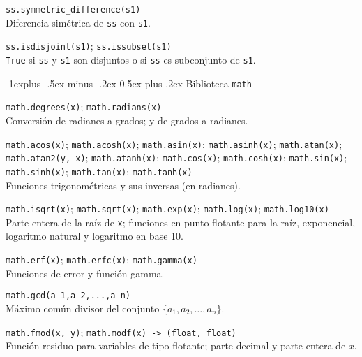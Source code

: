 \documentclass[10pt,landscape]{article}
\makeatletter
\renewcommand{\subsection}{\@startsection{subsection}{2}{0mm}%
                                {-1explus -.5ex minus -.2ex}%
                                {0.5ex plus .2ex}%
                                {\normalfont\normalsize\bfseries}}
\makeatother
\begin{document}
\begin{multicols}{3}
\begin{asparaitem}
\item  \verb|ss.symmetric_difference(s1)| \\
 \quad Diferencia simétrica de \verb|ss| con \verb|s1|.

\item  \verb|ss.isdisjoint(s1)|; \verb|ss.issubset(s1)| \\
  \quad \verb|True| si \verb|ss| y \verb|s1| son disjuntos o si \verb|ss| es subconjunto de \verb|s1|.
\end{asparaitem}

\subsection{Biblioteca \texttt{math}}

\begin{asparaitem}
    \item \verb|math.degrees(x)|; \verb|math.radians(x)| \\
      \quad Conversión de radianes a grados; y de grados a radianes.

\item \verb|math.acos(x)|;
      \verb|math.acosh(x)|;
      \verb|math.asin(x)|;
      \verb|math.asinh(x)|;
      \verb|math.atan(x)|;
      \verb|math.atan2(y, x)|;
      \verb|math.atanh(x)|;
      \verb|math.cos(x)|;
      \verb|math.cosh(x)|;
      \verb|math.sin(x)|;
      \verb|math.sinh(x)|;
      \verb|math.tan(x)|;
      \verb|math.tanh(x)| \\
\quad Funciones trigonométricas y sus inversas (en radianes).

\item \verb|math.isqrt(x)|; \verb|math.sqrt(x)|; \verb|math.exp(x)|; \verb|math.log(x)|; \verb|math.log10(x)| \\
\quad Parte entera de la raíz de \verb|x|; funciones en punto flotante para la raíz, exponencial, logaritmo natural y logaritmo en base 10.

    \item \verb|math.erf(x)|; \verb|math.erfc(x)|; \verb|math.gamma(x)| \\
\quad Funciones de error y función gamma.

  \item \verb|math.gcd(a_1,a_2,...,a_n)| \\
    \quad Máximo común divisor del conjunto $\{a_1,a_2,\dots,a_n\}$.

    \item \verb|math.fmod(x, y)|; \verb|math.modf(x) -> (float, float)| \\
\quad Función residuo para variables de tipo flotante; parte decimal y parte entera de $x$.


\end{asparaitem}
\end{multicols}
\end{document}
